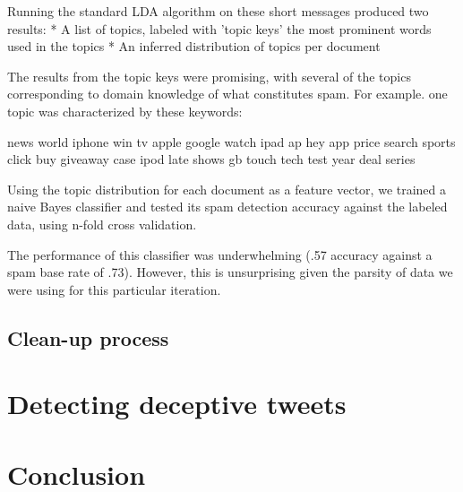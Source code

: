 \documentclass[times, 11pt, twocolumn]{article}
\begin{document}
Running the standard LDA algorithm on these short messages produced two results:
	* A list of topics, labeled with 'topic keys'  the most prominent words used in the topics
	* An inferred distribution of topics per document
    
The results from the topic keys were promising, with several of the topics corresponding to domain knowledge of what constitutes spam.  For example. one topic was characterized by these keywords:

news world iphone win tv apple google watch ipad ap hey  app price search sports click buy giveaway case ipod late shows gb touch  tech test year deal series 

Using the topic distribution for each document as a feature vector, we trained a naive Bayes classifier and tested its spam detection accuracy against the labeled data, using n-fold cross validation.

The performance of this classifier was underwhelming (.57 accuracy against a spam base rate of .73).  However, this is unsurprising given the parsity of data we were using for this particular iteration.
\subsection{Clean-up process}

\section{Detecting deceptive tweets}

\section{Conclusion}




\end{document}
